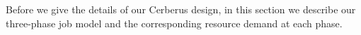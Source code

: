 Before we give the details of our Cerberus design, 
in this section we describe our three-phase job model 
and the corresponding resource demand at each phase. 







